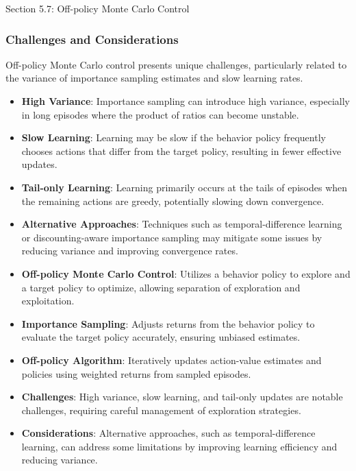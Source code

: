 \begin{notes}{Section 5.7: Off-policy Monte Carlo Control}
\begin{highlight}
    \end{highlight}
    
    \subsubsection*{Challenges and Considerations}
    
    Off-policy Monte Carlo control presents unique challenges, particularly related to the variance of importance sampling estimates and slow learning rates.
    
    \begin{highlight}
    
        \begin{itemize}
            \item \textbf{High Variance}: Importance sampling can introduce high variance, especially in long episodes where the product of ratios can become unstable.
            \item \textbf{Slow Learning}: Learning may be slow if the behavior policy frequently chooses actions that differ from the target policy, resulting in fewer effective updates.
            \item \textbf{Tail-only Learning}: Learning primarily occurs at the tails of episodes when the remaining actions are greedy, potentially slowing down convergence.
            \item \textbf{Alternative Approaches}: Techniques such as temporal-difference learning or discounting-aware importance sampling may mitigate some issues by reducing variance and improving convergence rates.
        \end{itemize}
    
    \end{highlight}
    
    \begin{highlight}
    
        \begin{itemize}
            \item \textbf{Off-policy Monte Carlo Control}: Utilizes a behavior policy to explore and a target policy to optimize, allowing separation of exploration and exploitation.
            \item \textbf{Importance Sampling}: Adjusts returns from the behavior policy to evaluate the target policy accurately, ensuring unbiased estimates.
            \item \textbf{Off-policy Algorithm}: Iteratively updates action-value estimates and policies using weighted returns from sampled episodes.
            \item \textbf{Challenges}: High variance, slow learning, and tail-only updates are notable challenges, requiring careful management of exploration strategies.
            \item \textbf{Considerations}: Alternative approaches, such as temporal-difference learning, can address some limitations by improving learning efficiency and reducing variance.
        \end{itemize}
    

\end{highlight}
\end{notes}
